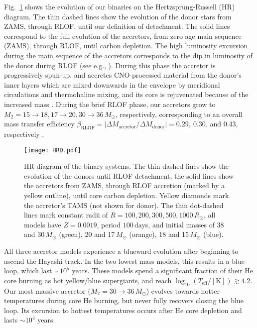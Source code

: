\documentclass[twocolumn,twocolappendix,trackchanges]{aastex63}
\DeclareRobustCommand{\Figref}[1]{Fig.~\ref{#1}}
\begin{document}
\Figref{fig:HRD} shows the evolution of our binaries on the
Hertzsprung-Russell (HR) diagram. The thin dashed lines %
show the evolution of the donor stars \citep[see also,
e.g.,][]{gotberg:2017, laplace:2021} from ZAMS, through RLOF, until our definition of
detachment. The solid lines correspond to the full evolution of the
accretors, from zero age main sequence (ZAMS), through RLOF, until
carbon depletion. The high luminosity excursion during the main
sequence of the accretors corresponds to the dip in luminosity of the
donor during RLOF (see e.g., \citealt{renzo:2021zoph}). During this phase the accretor is progressively
spun-up, and accretes CNO-processed material from the donor's inner
layers which are mixed downwards in the envelope by meridional
circulations and thermohaline mixing, and its core is rejuvenated
because of the increased mass \citep[see also][]{sravan:2019,
  renzo:2021zoph, wang:2020}. During the brief RLOF phase, our
accretors grow to
$M_2=15\rightarrow 18, 17\rightarrow 20, 30\rightarrow 36\,M_\odot$,
respectively, corresponding to an overall mass transfer efficiency
$\beta_\mathrm{RLOF}=|\Delta M_\mathrm{accretor}/\Delta M_\mathrm{donor}| = 0.29,\ 0.30,$\,and
0.43, respectively
\citep[see discussion in ][]{renzo:2021zoph}.

\begin{figure}[tbp]
  \texttt{[image: HRD.pdf]}
  \caption{HR diagram of the binary systems. The thin dashed lines
    show the evolution of the donors until RLOF detachment, the solid
    lines show the accretors from ZAMS, through RLOF accretion (marked
    by a yellow outline), until
    core carbon depletion. Yellow diamonds mark the accretor's TAMS
    (not shown for donor). The thin dot-dashed lines mark constant radii
    of $R=100, 200, 300, 500, 1000\,R_\odot$, all models have
    $Z=0.0019$, period $100$\,days, and initial masses of 38 and
    30\,$M_\odot$ (green), 20 and 17\,$M_\odot$ (orange), 18 and
    15\,$M_\odot$ (blue).}
  \label{fig:HRD}
\end{figure}

All three accretor models experience a blueward evolution after
beginning to ascend the Hayashi track. In the two lowest mass models,
this results in a blue-loop, which last $\sim{}10^5$ years. These
models spend a significant fraction of their He core burning as hot
yellow/blue supergiants, and reach
$\log_{10}(T_\mathrm{eff}/\mathrm{[K]})\gtrsim 4.2$. Our most massive
  accretor ($M_2=30\rightarrow 36\,M_\odot$) evolves towards hotter temperatures
  during core He burning, but never fully recovers closing the blue
  loop. Its excursion to hottest temperatures occurs after He core
  depletion and lasts $\sim{}10^{4}$ years.
\end{document}

